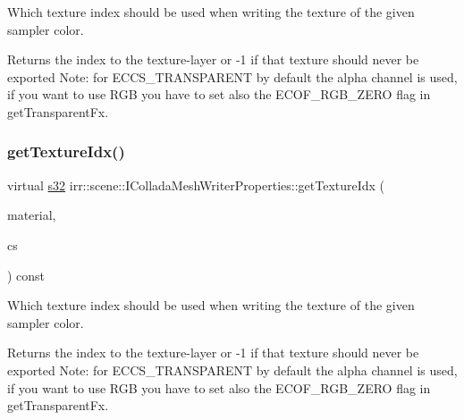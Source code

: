 Which texture index should be used when writing the texture of the given sampler color. 

\begin{DoxyReturn}{Returns}
the index to the texture-\/layer or -\/1 if that texture should never be exported Note\+: for E\+C\+C\+S\+\_\+\+T\+R\+A\+N\+S\+P\+A\+R\+E\+NT by default the alpha channel is used, if you want to use R\+GB you have to set also the E\+C\+O\+F\+\_\+\+R\+G\+B\+\_\+\+Z\+E\+RO flag in get\+Transparent\+Fx. 
\end{DoxyReturn}
\mbox{\label{classirr_1_1scene_1_1IColladaMeshWriterProperties_a171287213537036be889a36ae4896c0e}} 
\subsubsection{\texorpdfstring{get\+Texture\+Idx()}{getTextureIdx()}\hspace{0.1cm}{\footnotesize\ttfamily [2/2]}}
{\footnotesize\ttfamily virtual \hyperlink{namespaceirr_ac66849b7a6ed16e30ebede579f9b47c6}{s32} irr\+::scene\+::\+I\+Collada\+Mesh\+Writer\+Properties\+::get\+Texture\+Idx (\begin{DoxyParamCaption}\item[{const \hyperlink{classirr_1_1video_1_1SMaterial}{video\+::\+S\+Material} \&}]{material,  }\item[{\hyperlink{namespaceirr_1_1scene_a6204218341c6b449d879cd8367b2f8d8}{E\+\_\+\+C\+O\+L\+L\+A\+D\+A\+\_\+\+C\+O\+L\+O\+R\+\_\+\+S\+A\+M\+P\+L\+ER}}]{cs }\end{DoxyParamCaption}) const\hspace{0.3cm}{\ttfamily [pure virtual]}}



Which texture index should be used when writing the texture of the given sampler color. 

\begin{DoxyReturn}{Returns}
the index to the texture-\/layer or -\/1 if that texture should never be exported Note\+: for E\+C\+C\+S\+\_\+\+T\+R\+A\+N\+S\+P\+A\+R\+E\+NT by default the alpha channel is used, if you want to use R\+GB you have to set also the E\+C\+O\+F\+\_\+\+R\+G\+B\+\_\+\+Z\+E\+RO flag in get\+Transparent\+Fx. 
\end{DoxyReturn}
\mbox{\label{classirr_1_1scene_1_1IColladaMeshWriterProperties_ac547e1f89f4655751ecd570ad70d010b}} 
